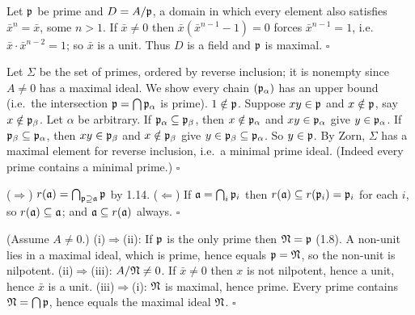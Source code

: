 \documentclass[11pt]{article}
\begin{document}
\pf
Let $\mathfrak p$ be prime and $D=A/\mathfrak p$, a domain in which every element also satisfies $\bar x^n=\bar x$, some $n>1$. If $\bar x\ne0$ then $\bar x(\bar x^{n-1}-1)=0$ forces $\bar x^{n-1}=1$, i.e.\ $\bar x\cdot\bar x^{n-2}=1$; so $\bar x$ is a unit. Thus $D$ is a field and $\mathfrak p$ is maximal. \hfill$\square$

\pf
Let $\Sigma$ be the set of primes, ordered by reverse inclusion; it is nonempty since $A\ne0$ has a maximal ideal. We show every chain $(\mathfrak p_\alpha)$ has an upper bound (i.e.\ the intersection $\mathfrak p=\bigcap\mathfrak p_\alpha$ is prime). $1\notin\mathfrak p$. Suppose $xy\in\mathfrak p$ and $x\notin\mathfrak p$, say $x\notin\mathfrak p_\beta$. Let $\alpha$ be arbitrary. If $\mathfrak p_\alpha\subseteq\mathfrak p_\beta$, then $x\notin\mathfrak p_\alpha$ and $xy\in\mathfrak p_\alpha$ give $y\in\mathfrak p_\alpha$. If $\mathfrak p_\beta\subseteq\mathfrak p_\alpha$, then $xy\in\mathfrak p_\beta$ and $x\notin\mathfrak p_\beta$ give $y\in\mathfrak p_\beta\subseteq\mathfrak p_\alpha$. So $y\in\mathfrak p$. By Zorn, $\Sigma$ has a maximal element for reverse inclusion, i.e.\ a minimal prime ideal. (Indeed every prime contains a minimal prime.) \hfill$\square$

\pf
($\Rightarrow$) $r(\mathfrak a)=\bigcap_{\mathfrak p\supseteq\mathfrak a}\mathfrak p$ by 1.14. ($\Leftarrow$) If $\mathfrak a=\bigcap_i\mathfrak p_i$ then $r(\mathfrak a)\subseteq r(\mathfrak p_i)=\mathfrak p_i$ for each $i$, so $r(\mathfrak a)\subseteq\mathfrak a$; and $\mathfrak a\subseteq r(\mathfrak a)$ always. \hfill$\square$

\pf
(Assume $A\ne0$.)
(i)$\Rightarrow$(ii): If $\mathfrak p$ is the only prime then $\mathfrak N=\mathfrak p$ (1.8). A non-unit lies in a maximal ideal, which is prime, hence equals $\mathfrak p=\mathfrak N$, so the non-unit is nilpotent.
(ii)$\Rightarrow$(iii): $A/\mathfrak N\ne0$. If $\bar x\ne0$ then $x$ is not nilpotent, hence a unit, hence $\bar x$ is a unit.
(iii)$\Rightarrow$(i): $\mathfrak N$ is maximal, hence prime. Every prime contains $\mathfrak N=\bigcap\mathfrak p$, hence equals the maximal ideal $\mathfrak N$. \hfill$\square$
\end{document}
